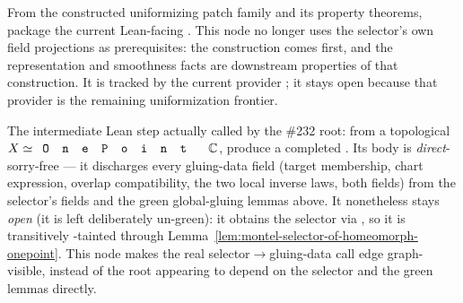 \begin{lemma}
\label{lem:montel-selector-of-homeomorph-onepoint}
From the constructed uniformizing patch family and its property theorems,
package the current Lean-facing
. This node no longer uses the
selector's own field projections as prerequisites: the construction comes first,
and the representation and smoothness facts are downstream properties of that
construction. It is tracked by the current provider
; it
stays open because that provider is the remaining uniformization frontier.
\end{lemma}

\begin{lemma}
\label{lem:genus-zero-gluing-data-from-selector}
The intermediate Lean step actually called by the \#232 root: from a topological
\(X\simeq\code{OnePoint}\,\C\), produce a completed .
Its body is \emph{direct}-sorry-free --- it discharges every gluing-data field
(target membership, chart expression, overlap compatibility, the two local
inverse laws, both  fields) from the selector's fields and the
green global-gluing lemmas above. It nonetheless stays \emph{open} (it is left
deliberately un-green): it obtains the selector via
, so it is
transitively -tainted through
Lemma~\ref{lem:montel-selector-of-homeomorph-onepoint}. This node makes the real
selector\(\to\)gluing-data call edge graph-visible, instead of the root appearing
to depend on the selector and the green lemmas directly.
\end{lemma}


